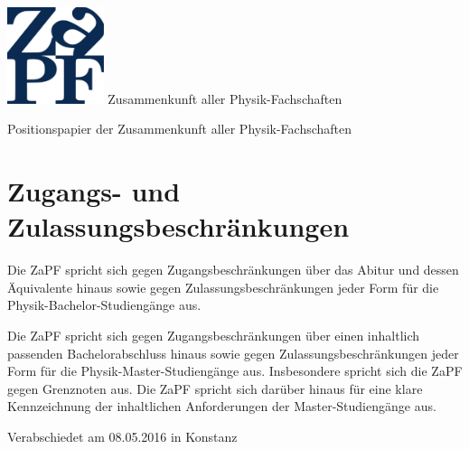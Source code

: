 \documentclass[DIV=calc]{scrartcl}
\begin{document}
    \hspace{0.87\textwidth}
    \begin{minipage}{120pt}
        \vspace{-1.8cm}
        \includegraphics[width=80pt]{logo.pdf}
        \centering
        \small Zusammenkunft aller Physik-Fachschaften
    \end{minipage}
    \begin{center}
        \huge{Positionspapier der Zusammenkunft aller Physik-Fachschaften} \\
        \normalsize
    \end{center}
    
    \vspace{1cm}
    \section*{Zugangs- und Zulassungsbeschr\"ankungen}
    
    Die ZaPF spricht sich gegen Zugangsbeschr\"ankungen \"uber das Abitur und dessen \"Aquivalente hinaus sowie gegen Zulassungsbeschr\"ankungen jeder Form für die Physik-Bachelor-Studieng\"ange aus.
    
    Die ZaPF spricht sich gegen Zugangsbeschr\"ankungen über einen inhaltlich passenden Bachelorabschluss hinaus sowie gegen Zulassungsbeschr\"ankungen jeder Form für die Physik-Master-Studieng\"ange aus. Insbesondere spricht sich die ZaPF gegen Grenznoten aus.
    Die ZaPF spricht sich darüber hinaus für eine klare Kennzeichnung der inhaltlichen Anforderungen der Master-Studieng\"ange aus.

    \vfill
    \begin{flushright}
        Verabschiedet am 08.05.2016 in Konstanz
    \end{flushright}
\end{document}

